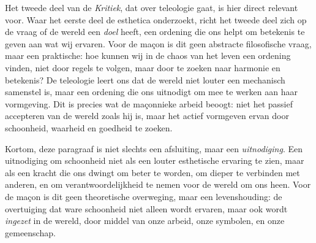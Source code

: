 \begin{mdframed}[leftmargin=0pt,rightmargin=0pt,backgroundcolor=blue!6,linecolor=white,innertopmargin=6pt,innerbottommargin=6pt]
Het tweede deel van de \textit{Kritiek}, dat over teleologie gaat, is hier direct relevant voor. Waar het eerste deel de esthetica onderzoekt, richt het tweede deel zich op de vraag of de wereld een \textit{doel} heeft, een ordening die ons helpt om betekenis te geven aan wat wij ervaren. Voor de maçon is dit geen abstracte filosofische vraag, maar een praktische: hoe kunnen wij in de chaos van het leven een ordening vinden, niet door regels te volgen, maar door te zoeken naar harmonie en betekenis? De teleologie leert ons dat de wereld niet louter een mechanisch samenstel is, maar een ordening die ons uitnodigt om mee te werken aan haar vormgeving. Dit is precies wat de maçonnieke arbeid beoogt: niet het passief accepteren van de wereld zoals hij is, maar het actief vormgeven ervan door schoonheid, waarheid en goedheid te zoeken.

Kortom, deze paragraaf is niet slechts een afsluiting, maar een \textit{uitnodiging}. Een uitnodiging om schoonheid niet als een louter esthetische ervaring te zien, maar als een kracht die ons dwingt om beter te worden, om dieper te verbinden met anderen, en om verantwoordelijkheid te nemen voor de wereld om ons heen. Voor de maçon is dit geen theoretische overweging, maar een levenshouding: de overtuiging dat ware schoonheid niet alleen wordt ervaren, maar ook wordt \textit{ingezet} in de wereld, door middel van onze arbeid, onze symbolen, en onze gemeenschap.
\end{mdframed}

